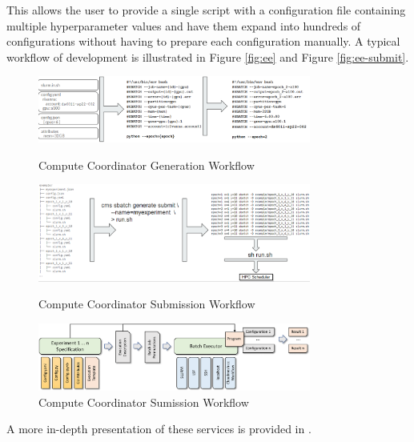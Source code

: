 This allows the user to provide a single script with a configuration file containing multiple hyperparameter values and have them expand into hundreds of configurations without having to prepare each configuration manually.
A typical workflow of development is illustrated in Figure \ref{fig:ee} and Figure \ref{fig:ee-submit}.

\begin{figure}[htb]
    \centering
    \includegraphics[width=0.8\textwidth]{images/sbatch-template.png}
    \caption{Compute Coordinator Generation Workflow}\label{fig:ee}

    \centering
    \includegraphics[width=0.8\textwidth]{images/sbatch-submit.png}
    \caption{Compute Coordinator Submission Workflow}\label{fig:ee-submit}

    \centering
    \includegraphics[width=0.8\textwidth]{images/sbatch.pdf}
    \caption{Compute Coordinator Sumission Workflow}\label{fig:sbatch-2}
\end{figure}

A more in-depth presentation of these services is provided in \cite{las-2023-ai-workflow,las-2023-escience}.

